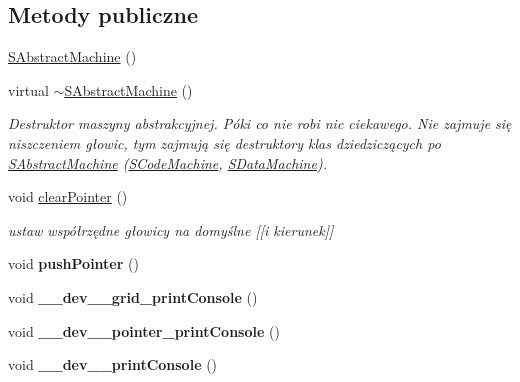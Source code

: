 \subsection*{Metody publiczne}
\begin{CompactItemize}
\item 
\hyperlink{classSAbstractMachine_f0ffb270de2ea44e89123a873bc5660a}{SAbstractMachine} ()
\item 
\hypertarget{classSAbstractMachine_2c4c79bd629a2961fb520785ce3adf4b}{
virtual \hyperlink{classSAbstractMachine_2c4c79bd629a2961fb520785ce3adf4b}{$\sim$SAbstractMachine} ()}
\label{classSAbstractMachine_2c4c79bd629a2961fb520785ce3adf4b}

\begin{CompactList}\small\item\em Destruktor maszyny abstrakcyjnej. Póki co nie robi nic ciekawego. Nie zajmuje się niszczeniem głowic, tym zajmują się destruktory klas dziedziczących po \hyperlink{classSAbstractMachine}{SAbstractMachine} (\hyperlink{classSCodeMachine}{SCodeMachine}, \hyperlink{classSDataMachine}{SDataMachine}). \item\end{CompactList}\item 
void \hyperlink{classSAbstractMachine_87766a003773869a3438e92739d7c9a1}{clearPointer} ()
\begin{CompactList}\small\item\em ustaw współrzędne głowicy na domyślne \mbox{[}\mbox{[}i kierunek\mbox{]}\mbox{]} \item\end{CompactList}\item 
\hypertarget{classSAbstractMachine_65a2d69dfa18ead7e26bf8ace4eb356d}{
void \textbf{pushPointer} ()}
\label{classSAbstractMachine_65a2d69dfa18ead7e26bf8ace4eb356d}

\item 
\hypertarget{classSAbstractMachine_f96c7b89921887960bc83516e7784a34}{
void \textbf{\_\-\_\-dev\_\-\_\-grid\_\-printConsole} ()}
\label{classSAbstractMachine_f96c7b89921887960bc83516e7784a34}

\item 
\hypertarget{classSAbstractMachine_fea2851366c3564f67e547b102c195e9}{
void \textbf{\_\-\_\-dev\_\-\_\-pointer\_\-printConsole} ()}
\label{classSAbstractMachine_fea2851366c3564f67e547b102c195e9}

\item 
\hypertarget{classSAbstractMachine_10fea0faba154b2254a33a0ccf865444}{
void \textbf{\_\-\_\-dev\_\-\_\-printConsole} ()}
\label{classSAbstractMachine_10fea0faba154b2254a33a0ccf865444}

\end{CompactItemize}
